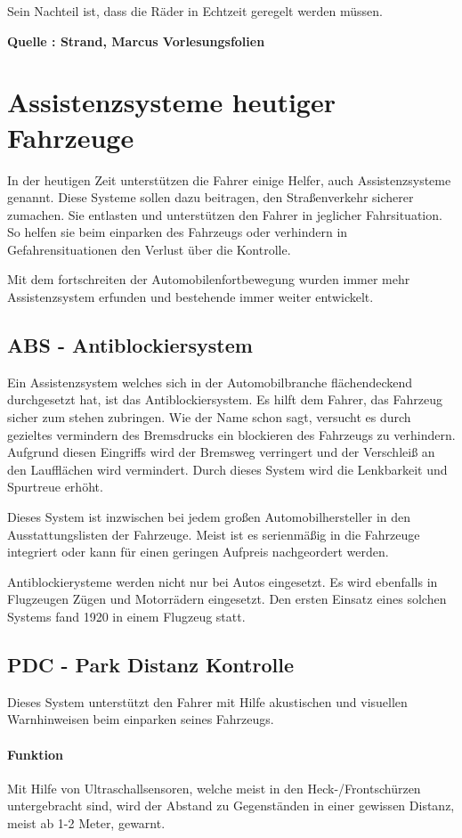 Sein Nachteil ist, dass die Räder in Echtzeit geregelt werden müssen.  

\textbf{Quelle : Strand, Marcus Vorlesungsfolien } 

\section{Assistenzsysteme heutiger Fahrzeuge}
In der heutigen Zeit unterstützen die Fahrer einige Helfer, auch Assistenzsysteme genannt. Diese Systeme sollen dazu beitragen, den Straßenverkehr sicherer zumachen. Sie entlasten und unterstützen den Fahrer in jeglicher Fahrsituation. So helfen sie beim einparken des Fahrzeugs oder verhindern in Gefahrensituationen den Verlust über die Kontrolle.

Mit dem fortschreiten der Automobilenfortbewegung wurden immer mehr Assistenzsystem erfunden und bestehende immer weiter entwickelt. 
\subsection{ABS - Antiblockiersystem}
Ein Assistenzsystem welches sich in der Automobilbranche flächendeckend durchgesetzt hat, ist das Antiblockiersystem. Es hilft dem Fahrer, das Fahrzeug sicher zum stehen zubringen. Wie der Name schon sagt, versucht es durch gezieltes vermindern des Bremsdrucks ein blockieren des Fahrzeugs zu verhindern. Aufgrund diesen Eingriffs wird der Bremsweg verringert und der Verschleiß an den Laufflächen wird vermindert. Durch dieses System wird die Lenkbarkeit und Spurtreue erhöht.

Dieses System ist inzwischen bei jedem großen Automobilhersteller in den Ausstattungslisten der Fahrzeuge. Meist ist es serienmäßig in die Fahrzeuge integriert oder kann für einen geringen Aufpreis nachgeordert werden. 

Antiblockierysteme werden nicht nur bei Autos eingesetzt. Es wird ebenfalls in Flugzeugen Zügen und Motorrädern eingesetzt. 
Den ersten Einsatz eines solchen Systems fand 1920 in einem Flugzeug statt.

\subsection{PDC - Park Distanz Kontrolle}
Dieses System unterstützt den Fahrer mit Hilfe akustischen und visuellen Warnhinweisen beim einparken seines Fahrzeugs. 
\paragraph{Funktion}Mit Hilfe von Ultraschallsensoren, welche meist in den Heck-/Frontschürzen untergebracht sind, wird der Abstand zu Gegenständen in einer gewissen Distanz, meist ab 1-2 Meter, gewarnt. 

